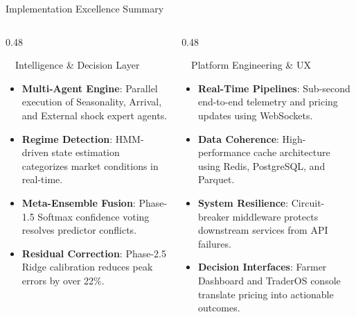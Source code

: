 \documentclass{beamer}
\begin{document}
\begin{frame}{Implementation Excellence Summary}
\vspace{-0.2cm}

\begin{columns}[T]
    \begin{column}{0.48\textwidth}
        \begin{successcard}[height=5.2cm]{~~Intelligence \& Decision Layer}
            \fontsize{6.8pt}{8.2pt}\selectfont
            \begin{itemize}\setlength\itemsep{4.5pt}\setlength\parskip{0pt}
                \item \textbf{Multi-Agent Engine}: Parallel execution of Seasonality, Arrival, and External shock expert agents.
                \item \textbf{Regime Detection}: HMM-driven state estimation categorizes market conditions in real-time.
                \item \textbf{Meta-Ensemble Fusion}: Phase-1.5 Softmax confidence voting resolves predictor conflicts.
                \item \textbf{Residual Correction}: Phase-2.5 Ridge calibration reduces peak errors by over 22\%.
            \end{itemize}
        \end{successcard}
    \end{column}
    
    \begin{column}{0.48\textwidth}
        \begin{infocard}[height=5.2cm]{~~Platform Engineering \& UX}
            \fontsize{6.8pt}{8.2pt}\selectfont
            \begin{itemize}\setlength\itemsep{3.5pt}\setlength\parskip{0pt}
                \item \textbf{Real-Time Pipelines}: Sub-second end-to-end telemetry and pricing updates using WebSockets.
                \item \textbf{Data Coherence}: High-performance cache architecture using Redis, PostgreSQL, and Parquet.
                \item \textbf{System Resilience}: Circuit-breaker middleware protects downstream services from API failures.
                \item \textbf{Decision Interfaces}: Farmer Dashboard and TraderOS console translate pricing into actionable outcomes.
            \end{itemize}
        \end{infocard}
    \end{column}
\end{columns}


\end{frame}
\end{document}
